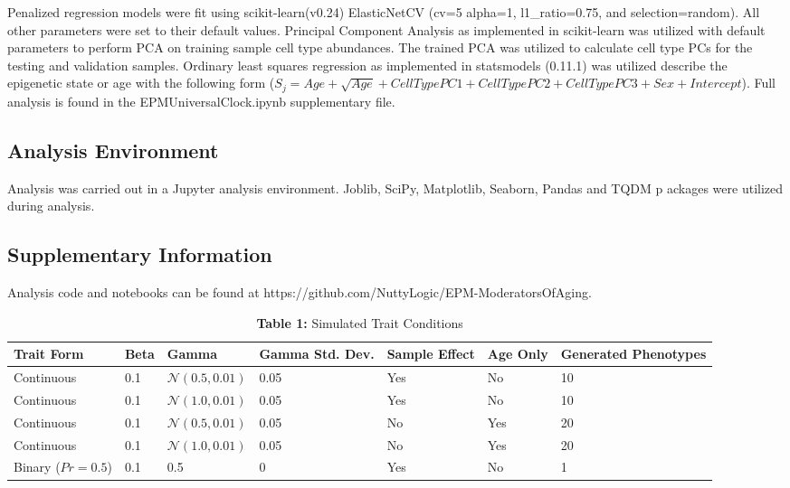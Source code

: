 \documentclass{article}
\begin{document}
{\begin{linenumbers}
Penalized regression models were fit using scikit-learn(v0.24)\cite{Pedregosa2011-fi} 
ElasticNetCV (cv=5 alpha=1, l1\_ratio=0.75, and selection=random). All other parameters were set to their 
default values. Principal Component Analysis as implemented in scikit-learn was utilized with default parameters 
to perform PCA on training sample cell type abundances. The trained PCA was utilized to calculate cell type PCs 
for the testing and validation samples. Ordinary least squares regression as implemented in statsmodels 
(0.11.1)\cite{Seabold2010-lt} was utilized describe the epigenetic state or age with the following 
form ($S_j  = Age + \sqrt{Age} + Cell Type PC1 + Cell Type PC2 + Cell Type PC3 + Sex + Intercept$). 
Full analysis is found in the EPMUniversalClock.ipynb supplementary file. 

\subsection{Analysis Environment}

Analysis was carried out in a Jupyter\cite{Basu_undated-vq} analysis environment.
 Joblib\cite{Varoquaux2009-al}, SciPy\cite{Virtanen2020-wt}, Matplotlib\cite{Hunter2007-nq}, 
 Seaborn\cite{Waskom2021-gj}, Pandas\cite{McKinney2012-ta} and TQDM\cite{Da_Costa-Luis2019-lr} p
 ackages were utilized during analysis. 

\subsection{Supplementary Information}

Analysis code and notebooks can be found at https://github.com/NuttyLogic/EPM-ModeratorsOfAging.

\end{linenumbers}
\printbibliography



\begin{table}[H]
\caption*{\textbf{Table 1:} Simulated Trait Conditions}  
\begin{tabular}{| p{20mm} | p{15mm} | p{20mm} | p{20mm} | p{20mm} | p{20mm} | p{20mm} |}
\hline
\textbf{Trait Form}&\textbf{Beta}&\textbf{Gamma}&\textbf{Gamma Std. Dev.}&\textbf{Sample Effect}&
\textbf{Age Only}&\textbf{Generated Phenotypes}\\ \hline
Continuous&0.1&$\mathcal{N}(0.5, 0.01)$&0.05&Yes&No&10\\ \hline
Continuous&0.1&$\mathcal{N}(1.0, 0.01)$&0.05&Yes&No&10\\ \hline
Continuous&0.1&$\mathcal{N}(0.5, 0.01)$&0.05&No&Yes&20\\ \hline
Continuous&0.1&$\mathcal{N}(1.0, 0.01)$&0.05&No&Yes&20\\ \hline
Binary ($Pr=0.5$)&0.1&0.5&0&Yes&No&1\\ \hline
\end{tabular}
\end{table}

}
\end{document}

